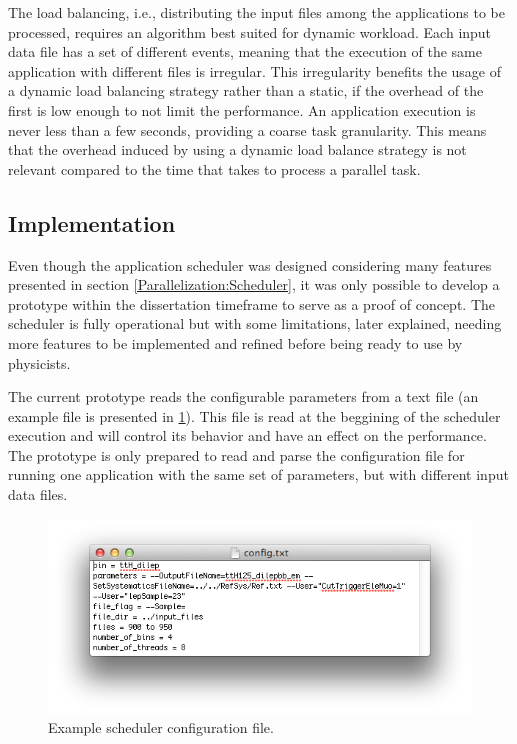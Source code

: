 The load balancing, i.e., distributing the input files among the applications to be processed, requires an algorithm best suited for dynamic workload. Each input data file has a set of different events, meaning that the execution of the same application with different files is irregular. This irregularity benefits the usage of a dynamic load balancing strategy rather than a static, if the overhead of the first is low enough to not limit the performance. An application execution is never less than a few seconds, providing a coarse task granularity. This means that the overhead induced by using a dynamic load balance strategy is not relevant compared to the time that takes to process a parallel task.

\subsection{Implementation}
\label{SchedulerImplementation}

Even though the application scheduler was designed considering many features presented in section \ref{Parallelization:Scheduler}, it was only possible to develop a prototype within the dissertation timeframe to serve as a proof of concept. The scheduler is fully operational but with some limitations, later explained, needing more features to be implemented and refined before being ready to use by physicists.

The current prototype reads the configurable parameters from a text file (an example file is presented in \ref{fig:SchedulerFile}). This file is read at the beggining of the scheduler execution and will control its behavior and have an effect on the performance. The prototype is only prepared to read and parse the configuration file for running one application with the same set of parameters, but with different input data files.

\begin{figure}[!htp]
	\begin{center}
		\includegraphics[scale=0.8]{../../common/img/scheduler_config.png}
		\caption{Example scheduler configuration file.}
		\label{fig:SchedulerFile}
	\end{center}
\end{figure}

